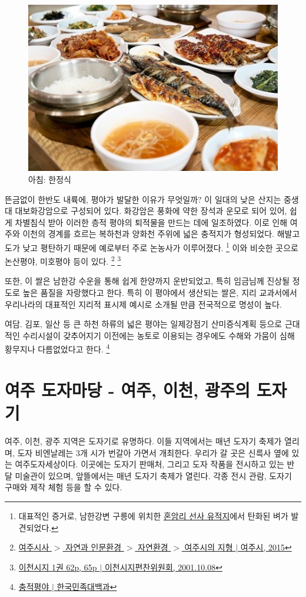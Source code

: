 \begin{figure}[ht]
    \centering
    \includegraphics[width=.6\textwidth]{img/한정식.jpg}
    \caption{아침: 한정식 \protect\footnotemark}
    \label{fig:my_labe2}
\end{figure}
뜬금없이 한반도 내륙에, 평야가 발달한 이유가 무엇일까?
이 일대의 낮은 산지는 중생대 대보화강암으로 구성되어 있다. 
화강암은 풍화에 약한 장석과 운모로 되어 있어,
쉽게 차별침식 받아 이러한 층적 평야의 퇴적물을 만드는 데에 일조하였다.
이로 인해 여주와 이천의 경계를 흐르는 복하천과 양화천 주위에 넓은 충적지가 형성되었다.
해발고도가 낮고 평탄하기 때문에 예로부터 주로 논농사가 이루어졌다.
\footnote{대표적인 증거로, 남한강변 구릉에 위치한 \href{https://terms.naver.com/entry.naver?docId=1793906&cid=49217&categoryId=49217}{혼암리 선사 유적지}에서 탄화된 벼가 발견되었다.}
이와 비슷한 곳으로 논산평야, 미호평야 등이 있다.
\footnote{ \href{https://www.yeoju.go.kr/history/main.jsp}{여주시사 $>$ 자연과 인문환경 $>$ 자연환경 $>$ 여주시의 지형 $|$ 여주시, 2015}}
\footnote{ \href{https://memory.library.kr/items/show/23956}{이천시지 1권 62p, 65p $|$ 이천시지편찬위원회, 2001.10.08}}

또한, 이 쌀은 남한강 수운을 통해 쉽게 한양까지 운반되었고, 특히 임금님께 진상될 정도로 높은 품질을 자랑했다고 한다.
특히 이 평야에서 생산되는 쌀은, 지리 교과서에서 우리나라의 대표적인 지리적 표시제 예시로 소개될 만큼 전국적으로 명성이 높다.

여담. 김포, 일산 등 큰 하천 하류의 넓은 평야는 일제강점기 산미증식계획 등으로 근대적인 수리시설이 갖추어지기 이전에는 농토로 이용되는 경우에도 수해와 가뭄이 심해 황무지나 다름없었다고 한다.
\footnote{\href{https://terms.naver.com/entry.naver?docId=795631&cid=46617&categoryId=46617}{충적평야 $|$ 한국민족대백과}}
\section{여주 도자마당 - 여주, 이천, 광주의 도자기}
여주, 이천, 광주 지역은 도자기로 유명하다. 이들 지역에서는 매년 도자기 축제가 열리며, 도자 비엔날레는 3개 시가 번갈아 가면서 개최한다.
우리가 갈 곳은 신륵사 옆에 있는 여주도자세상이다.
이곳에는 도자기 판매처, 그리고 도자 작품을 전시하고 있는 반달 미술관이 있으며, 앞뜰에서는 매년 도자기 축제가 열린다. 
각종 전시 관람, 도자기 구매와 제작 체험 등을 할 수 있다.

